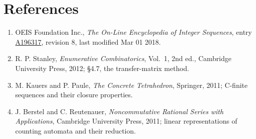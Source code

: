 \documentclass[11pt]{article}
\theoremstyle{definition}
\begin{document}
\section{References}

\begin{enumerate}

\item OEIS Foundation Inc., \emph{The On-Line Encyclopedia of Integer Sequences}, entry \href{https://oeis.org/A196317}{A196317}, revision 8, last modified Mar 01 2018.

\item R. P. Stanley, \emph{Enumerative Combinatorics}, Vol.~1, 2nd ed., Cambridge University Press, 2012; \S4.7, the transfer-matrix method.

\item M. Kauers and P. Paule, \emph{The Concrete Tetrahedron}, Springer, 2011; C-finite sequences and their closure properties.

\item J. Berstel and C. Reutenauer, \emph{Noncommutative Rational Series with Applications}, Cambridge University Press, 2011; linear representations of counting automata and their reduction.

\end{enumerate}
\end{document}
